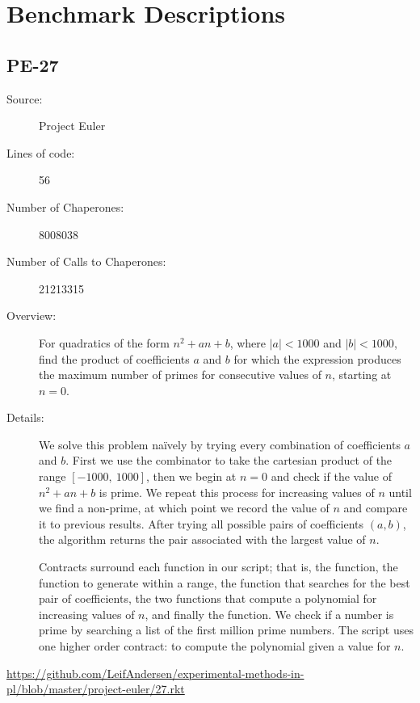 \section{Benchmark Descriptions}

\subsection*{PE-27~\hrulefill}
\begin{description}
\item[Source:] Project Euler
\item[Lines of code:] 56
\item[Number of Chaperones:] 8008038
\item[Number of Calls to Chaperones:] 21213315
\item[Overview:] For quadratics of the form $n^2 + an + b$, where $|a| < 1000$ and $|b| < 1000$, find the product of coefficients $a$ and $b$ for which the expression produces the maximum number of primes for consecutive values of $n$, starting at $n=0$.
\item[Details:] 
  We solve this problem na\"ively by trying every combination of coefficients $a$ and $b$.
  First we use the  combinator to take the cartesian product of the range $[-1000,~1000]$, then we begin at $n=0$ and check if the value of $n^2 + an + b$ is prime.
  We repeat this process for increasing values of $n$ until we find a non-prime, at which point we record the value of $n$ and compare it to previous results.
  After trying all possible pairs of coefficients $(a,b)$, the algorithm returns the pair associated with the largest value of $n$.

  Contracts surround each function in our script; that is, the  function, the function to generate  within a range, the function  that searches for the best pair of coefficients, the two functions that compute a polynomial for increasing values of $n$, and finally the  function.
  We check if a number is prime by searching a list of the first million prime numbers.
  The script uses one higher order contract: to compute the polynomial given a value for $n$.
\end{description}
\url{https://github.com/LeifAndersen/experimental-methods-in-pl/blob/master/project-euler/27.rkt}

